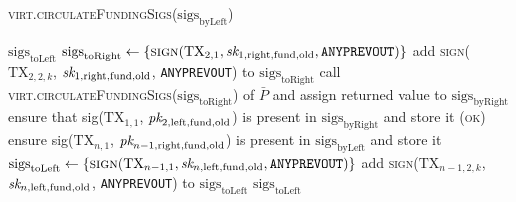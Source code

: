 \begin{center}
\begin{processbox}{\textsc{virt.circulateFundingSigs}($\mathrm{sigs}_{\mathrm{byLeft}}$)}
\begin{algorithmic}[1]
        \EndIf
        \State \Return $\mathrm{sigs}_{\mathrm{toLeft}}$
       
        \State $\mathrm{sigs}_{\mathrm{toRight}} \gets
        \{\textsc{sign}(\mathrm{TX}_{2, 1}, \textit{sk}_{1, \mathrm{right},
        \mathrm{fund}, \mathrm{old}}, \texttt{ANYPREVOUT})\}$
        \label{code:virtual-layer:funding-sigs:funder-sign-first}
          \State add \textsc{sign}($\mathrm{TX}_{2, 2, k}$, $\textit{sk}_{1,
          \mathrm{right}, \mathrm{fund}, \mathrm{old}}$, \texttt{ANYPREVOUT})
          to $\mathrm{sigs}_{\mathrm{toRight}}$
        \EndFor
        \label{code:virtual-layer:funding-sigs:funder-sign-second-end}
        \State call
        \textsc{virt.circulateFundingSigs}($\mathrm{sigs}_{\mathrm{toRight}}$)
        of $\bar{P}$ and assign returned value to
        $\mathrm{sigs}_{\mathrm{byRight}}$
        \State ensure that sig($\mathrm{TX}_{1, 1}$, $\textit{pk}_{2, \mathrm{left},
        \mathrm{fund}, \mathrm{old}}$) is present in
        $\mathrm{sigs}_{\mathrm{byRight}}$ and store it
        \label{code:virtual-layer:funding-sigs:funder-check-sig}
        \State \Return (\textsc{ok})
       
        \State ensure sig($\mathrm{TX}_{n, 1}$, $\textit{pk}_{n-1, \mathrm{right},
        \mathrm{fund}, \mathrm{old}}$) is present in
        $\mathrm{sigs}_{\mathrm{byLeft}}$ and store it
        \State $\mathrm{sigs}_{\mathrm{toLeft}} \gets
        \{\textsc{sign}(\mathrm{TX}_{n-1, 1}, \textit{sk}_{n, \mathrm{left},
        \mathrm{fund}, \mathrm{old}}, \texttt{ANYPREVOUT})\}$
          \State add \textsc{sign}($\mathrm{TX}_{n-1, 2, k}$, $\textit{sk}_{n,
          \mathrm{left}, \mathrm{fund}, \mathrm{old}}$, \texttt{ANYPREVOUT}) to
          $\mathrm{sigs}_{\mathrm{toLeft}}$
        \EndFor
        \State \Return $\mathrm{sigs}_{\mathrm{toLeft}}$
      \EndIf \: 
    \end{algorithmic}
  \end{processbox}
  \label{code:virtual-layer:funding-sigs}
\end{center} \ \\

